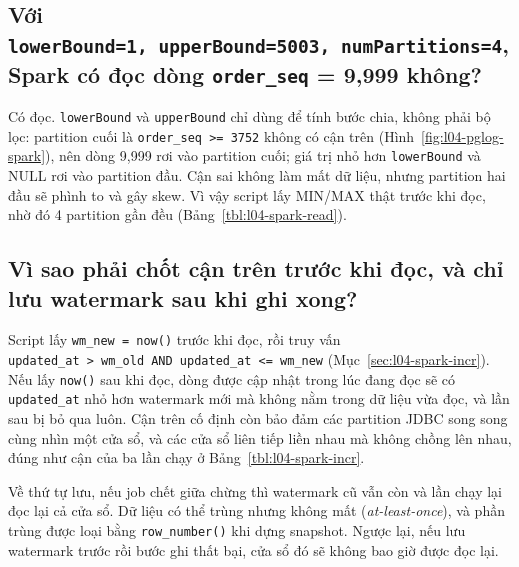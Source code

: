 \documentclass[
  12pt,
  a4paper,
]{article}
\begin{document}
\subsection{\texorpdfstring{Với
\texttt{lowerBound=}\allowbreak{}\texttt{1,}\allowbreak{}\texttt{\ upperBound=}\allowbreak{}\texttt{5003,}\allowbreak{}\texttt{\ numPartitions=}\allowbreak{}\texttt{4}\allowbreak{},
Spark có đọc dòng \texttt{order\_seq} = 9,999
không?}{Với lowerBound=1, upperBound=5003, numPartitions=4, Spark có đọc dòng order\_seq = 9,999 không?}}\label{sec:l04-q3}

Có đọc. \texttt{lowerBound} và \texttt{upperBound} chỉ dùng để tính bước
chia, không phải bộ lọc: partition cuối là
\texttt{order\_}\allowbreak{}\texttt{seq\ \textgreater{}=}\allowbreak{}\texttt{\ 3752}\allowbreak{}
không có cận trên (Hình~\ref{fig:l04-pglog-spark}), nên dòng 9,999 rơi
vào partition cuối; giá trị nhỏ hơn \texttt{lowerBound} và NULL rơi vào
partition đầu. Cận sai không làm mất dữ liệu, nhưng partition hai đầu sẽ
phình to và gây skew. Vì vậy script lấy MIN/MAX thật trước khi đọc, nhờ
đó 4 partition gần đều (Bảng~\ref{tbl:l04-spark-read}).

\subsection{Vì sao phải chốt cận trên trước khi đọc, và chỉ lưu
watermark sau khi ghi xong?}\label{sec:l04-q4}

Script lấy \texttt{wm\_new\ =\ now()} trước khi đọc, rồi truy vấn
\texttt{updated\_}\allowbreak{}\texttt{at\ \textgreater{}\ wm\_}\allowbreak{}\texttt{old\ AND\ updated\_}\allowbreak{}\texttt{at\ \textless{}=}\allowbreak{}\texttt{\ wm\_}\allowbreak{}\texttt{new}\allowbreak{}
(Mục~\ref{sec:l04-spark-incr}). Nếu lấy \texttt{now()} sau khi đọc, dòng
được cập nhật trong lúc đang đọc sẽ có \texttt{updated\_at} nhỏ hơn
watermark mới mà không nằm trong dữ liệu vừa đọc, và lần sau bị bỏ qua
luôn. Cận trên cố định còn bảo đảm các partition JDBC song song cùng
nhìn một cửa sổ, và các cửa sổ liên tiếp liền nhau mà không chồng lên
nhau, đúng như cận của ba lần chạy ở Bảng~\ref{tbl:l04-spark-incr}.

Về thứ tự lưu, nếu job chết giữa chừng thì watermark cũ vẫn còn và lần
chạy lại đọc lại cả cửa sổ. Dữ liệu có thể trùng nhưng không mất
(\emph{at-least-once}), và phần trùng được loại bằng
\texttt{row\_number()} khi dựng snapshot. Ngược lại, nếu lưu watermark
trước rồi bước ghi thất bại, cửa sổ đó sẽ không bao giờ được đọc lại.
\end{document}
